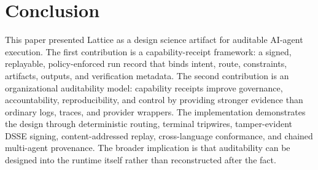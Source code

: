 \documentclass[conference]{IEEEtran}
\begin{document}
\section{Conclusion}

This paper presented Lattice as a design science artifact for auditable AI-agent
execution. The first contribution is a capability-receipt framework: a signed,
replayable, policy-enforced run record that binds intent, route, constraints,
artifacts, outputs, and verification metadata. The second contribution is an
organizational auditability model: capability receipts improve governance,
accountability, reproducibility, and control by providing stronger evidence than
ordinary logs, traces, and provider wrappers. The implementation demonstrates
the design through deterministic routing, terminal tripwires, tamper-evident
DSSE signing, content-addressed replay, cross-language conformance, and chained
multi-agent provenance. The broader implication is that auditability can be
designed into the runtime itself rather than reconstructed after the fact.



\end{document}
